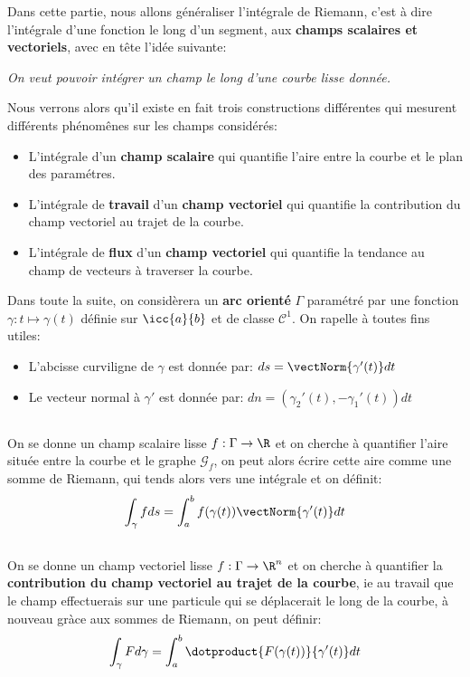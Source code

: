 Dans cette partie, nous allons généraliser l'intégrale de Riemann, c'est à dire l'intégrale d'une fonction le long d'un segment, aux \textbf{champs scalaires et vectoriels}, avec en tête l'idée suivante:
\begin{center}
   \textit{On veut pouvoir intégrer un champ le long d'une courbe lisse donnée.}
\end{center}
Nous verrons alors qu'il existe en fait trois constructions différentes qui mesurent différents phénomênes sur les champs considérés:
\begin{itemize}
   \item L'intégrale d'un \textbf{champ scalaire} qui quantifie l'aire entre la courbe et le plan des paramétres.
   \item L'intégrale de \textbf{travail} d'un \textbf{champ vectoriel} qui quantifie la contribution du champ vectoriel au trajet de la courbe.
   \item L'intégrale de \textbf{flux} d'un \textbf{champ vectoriel} qui quantifie la tendance au champ de vecteurs à traverser la courbe.
\end{itemize}
Dans toute la suite, on considèrera un \textbf{arc orienté} \(\Gamma\) paramétré par une fonction \(\gamma : t \mapsto \gamma(t)\) définie sur \(\icc{a}{b}\) et de classe \(\mathcal{C}^1\). On rapelle à toutes fins utiles:
\begin{itemize}
   \item L'abcisse curviligne de \(\gamma\) est donnée par: \(ds = \vectNorm{\gamma'(t)} d t  \)
   \item Le vecteur normal à \(\gamma'\) est donnée par: \(dn = (\gamma_2'(t), -\gamma_1'(t))d t  \)
\end{itemize}
\subsection*{}
On se donne un champ scalaire lisse \(f : \Gamma \rightarrow \R\) et on cherche à quantifier l'aire située entre la courbe et le graphe \(\mathscr{G}_f\), on peut alors écrire cette aire comme une somme de Riemann, qui tends alors vers une intégrale et on définit:
\[
   \int_{\gamma} f d s = \int_{a}^{b}f(\gamma(t))\vectNorm{\gamma'(t)}d t
\]
\subsection*{}
On se donne un champ vectoriel lisse \(f : \Gamma \rightarrow \R^n\) et on cherche à quantifier la \textbf{contribution du champ vectoriel au trajet de la courbe}, ie au travail que le champ effectuerais sur une particule qui se déplacerait le long de la courbe, à nouveau gràce aux sommes de Riemann, on peut définir:
\[
   \int_{\gamma} F d \gamma = \int_{a}^{b} \dotproduct{F(\gamma(t))}{\gamma'(t)}dt
\]
